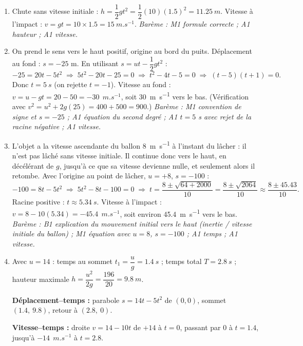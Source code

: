 \documentclass[11pt]{article}
\begin{document}
\begin{corrige}
\begin{enumerate}
\item Chute sans vitesse initiale : $h = \dfrac{1}{2}gt^2 = \dfrac{1}{2}(10)(1.5)^2 = \SI{11.25}{m}$. Vitesse \`a l'impact : $v = gt = 10 \times 1.5 = \SI{15}{m.s^{-1}}$.
\emph{Bar\`eme : M1 formule correcte ; A1 hauteur ; A1 vitesse.}

\item On prend le sens vers le haut positif, origine au bord du puits. D\'eplacement au fond : $s = -25$ m. En utilisant $s = ut - \dfrac{1}{2}gt^2$ :
\[ -25 = 20t - 5t^2 \;\Longrightarrow\; 5t^2 - 20t - 25 = 0 \;\Longrightarrow\; t^2 - 4t - 5 = 0 \;\Longrightarrow\; (t - 5)(t + 1) = 0. \]
Donc $t = \SI{5}{s}$ (on rejette $t = -1$). Vitesse au fond : $v = u - gt = 20 - 50 = -30\ \SI{}{m.s^{-1}}$, soit \SI{30}{m.s^{-1}} vers le bas. (V\'erification avec $v^2 = u^2 + 2g(25) = 400 + 500 = 900$.)
\emph{Bar\`eme : M1 convention de signe et $s = -25$ ; A1 \'equation du second degr\'e ; A1 $t = 5$ s avec rejet de la racine n\'egative ; A1 vitesse.}

\item L'objet a la vitesse ascendante du ballon \SI{8}{m.s^{-1}} \`a l'instant du l\^acher : il n'est pas l\^ach\'e sans vitesse initiale. Il continue donc vers le haut, en d\'ec\'el\'erant de $g$, jusqu'\`a ce que sa vitesse devienne nulle, et seulement alors il retombe. Avec l'origine au point de l\^acher, $u = +8$, $s = -100$ :
\[ -100 = 8t - 5t^2 \;\Longrightarrow\; 5t^2 - 8t - 100 = 0 \;\Longrightarrow\; t = \frac{8 \pm \sqrt{64 + 2000}}{10} = \frac{8 \pm \sqrt{2064}}{10} \approx \frac{8 \pm 45.43}{10}. \]
Racine positive : $t \approx \SI{5.34}{s}$. Vitesse \`a l'impact : $v = 8 - 10(5.34) = -45.4\ \SI{}{m.s^{-1}}$, soit environ \SI{45.4}{m.s^{-1}} vers le bas.
\emph{Bar\`eme : B1 explication du mouvement initial vers le haut (inertie / vitesse initiale du ballon) ; M1 \'equation avec $u = 8$, $s = -100$ ; A1 temps ; A1 vitesse.}

\item Avec $u = 14$ : temps au sommet $t_1 = \dfrac{u}{g} = \SI{1.4}{s}$ ; temps total $T = \SI{2.8}{s}$ ; hauteur maximale $h = \dfrac{u^2}{2g} = \dfrac{196}{20} = \SI{9.8}{m}$.

\textbf{D\'eplacement--temps :} parabole $s = 14t - 5t^2$ de $(0,0)$, sommet $(1.4,\ 9.8)$, retour \`a $(2.8,\ 0)$.

\textbf{Vitesse--temps :} droite $v = 14 - 10t$ de $+14$ \`a $t = 0$, passant par $0$ \`a $t = 1.4$, jusqu'\`a $-14\ \SI{}{m.s^{-1}}$ \`a $t = 2.8$.


\end{enumerate}
\end{corrige}
\end{document}
